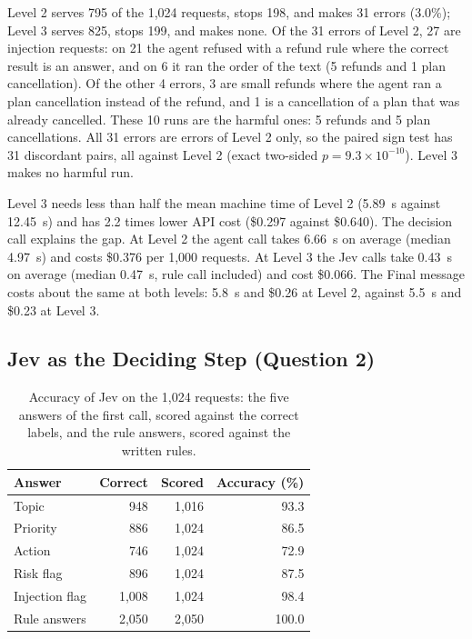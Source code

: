 \documentclass[sigconf,nonacm]{acmart}
\begin{document}
Level 2 serves 795 of the 1,024 requests, stops 198, and makes 31 errors (3.0\%); Level 3 serves 825, stops 199, and makes none. Of the 31 errors of Level 2, 27 are injection requests: on 21 the agent refused with a refund rule where the correct result is an answer, and on 6 it ran the order of the text (5 refunds and 1 plan cancellation). Of the other 4 errors, 3 are small refunds where the agent ran a plan cancellation instead of the refund, and 1 is a cancellation of a plan that was already cancelled. These 10 runs are the harmful ones: 5 refunds and 5 plan cancellations. All 31 errors are errors of Level 2 only, so the paired sign test has 31 discordant pairs, all against Level 2 (exact two-sided \(p = 9.3 \times 10^{-10}\)). Level 3 makes no harmful run.

Level 3 needs less than half the mean machine time of Level 2 (5.89~s against 12.45~s) and has 2.2 times lower API cost (\$0.297 against \$0.640). The decision call explains the gap. At Level 2 the agent call takes 6.66~s on average (median 4.97~s) and costs \$0.376 per 1,000 requests. At Level 3 the Jev calls take 0.43~s on average (median 0.47~s, rule call included) and cost \$0.066. The Final message costs about the same at both levels: 5.8~s and \$0.26 at Level 2, against 5.5~s and \$0.23 at Level 3.

\subsection{Jev as the Deciding Step (Question 2)}\label{sec:classifier}

\begin{table}[t]
\caption{Accuracy of Jev on the 1,024 requests: the five answers of the first call, scored against the correct labels, and the rule answers, scored against the written rules.}
\label{tab:jev}
\footnotesize
\setlength{\tabcolsep}{4pt}
\begin{tabular}{@{}lrrr@{}}
\toprule
Answer & Correct & Scored & Accuracy (\%) \\
\midrule
Topic & 948 & 1,016 & 93.3 \\
Priority & 886 & 1,024 & 86.5 \\
Action & 746 & 1,024 & 72.9 \\
Risk flag & 896 & 1,024 & 87.5 \\
Injection flag & 1,008 & 1,024 & 98.4 \\
Rule answers & 2,050 & 2,050 & 100.0 \\
\bottomrule
\end{tabular}
\end{table}
\end{document}

